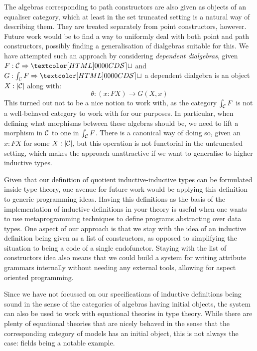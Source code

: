 The algebras corresponding to path constructors are also given as
objects of an equaliser category, which at least in the set truncated
setting is a natural way of describing them. They are treated
separately from point constructors, however. Future work would be to
find a way to uniformly deal with both point and path constructors,
possibly finding a generalisation of dialgebras suitable for this. We
have attempted such an approach by considering \emph{dependent
  dialgebras}, \ie given $F : \Func{\Cc}{\SET}$ and
$G : \Func{\int_{\Cc} F}{\SET}$ a dependent dialgebra is an object
$X : | \mathcal{C} |$ along with:
$$
\theta : (x : FX) \to G (X , x)
$$
This turned out not to be a nice notion to work with, as the category
$\int_{\mathcal{C}} F$ is not a well-behaved category to work with for our
purposes. In particular, when defining what morphisms between these
algebras should be, we need to lift a morphism in $\mathcal{C}$ to one in
$\int_{\mathcal{C}} F$. There is a canonical way of doing so, given an
$x : FX$ for some $X : | \mathcal{C} |$, but this operation is not functorial
in the untruncated setting, which makes the approach unattractive if
we want to generalise to higher inductive types.

Given that our definition of quotient inductive-inductive types can be
formulated inside type theory, one avenue for future work would be
applying this definition to generic programming ideas. Having this
definitions as the basis of the implementation of inductive
definitions in your theory is useful when one wants to use
metaprogramming techniques to define programs abstracting over data
types. One aspect of our approach is that we stay with the idea of an
inductive definition being given as a list of constructors, as opposed
to simplifying the situation to being a code of a single
endofunctor. Staying with the list of constructors idea also means
that we could build a system for writing attribute grammars internally
without needing any external tools, allowing for aspect oriented
programming.

Since we have not focussed on our specifications of inductive
definitions being sound in the sense of the categories of algebras
having initial objects, the system can also be used to work with
equational theories in type theory. While there are plenty of
equational theories that are nicely behaved in the sense that the
corresponding category of models has an initial object, this is not
always the case: fields being a notable example.

